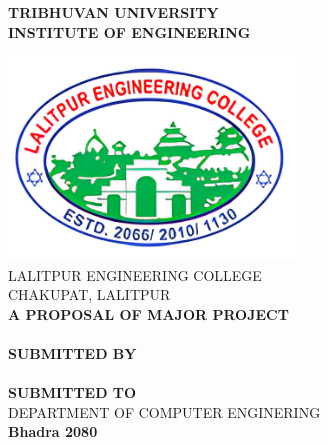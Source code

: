 \begin{center}

    \thispagestyle{empty}
    {\fontsize{16 pt}{12} \selectfont\textbf{TRIBHUVAN UNIVERSITY} \\
        \textbf{INSTITUTE OF ENGINEERING}} \\
    \vspace{0.3 in}

    \includegraphics[width= 3in ]{img/leclogo21.png} \\
    \vspace{0.05 in}
    LALITPUR ENGINEERING COLLEGE \\
    CHAKUPAT, LALITPUR \\

    \vspace{0.5 in}
    \textbf{ A PROPOSAL OF MAJOR PROJECT}\\
    {\fontsize{16 pt}{12} \selectfont \textbf{\thetitle}}\\
    \vspace{1.1 in}
    \textbf{ SUBMITTED BY}  \\
    {\theauthor} \\
    \vspace{1.1 in}
    \textbf{ SUBMITTED TO}  \\
    DEPARTMENT OF COMPUTER ENGINERING \\
    \vspace{1 in}
    \textbf{Bhadra 2080} \\
\end{center}